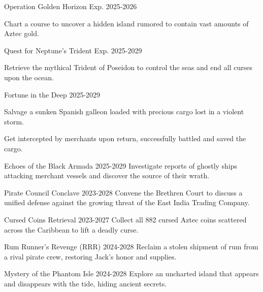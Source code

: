 

\begin{cventries}
\cventry
{Operation Golden Horizon} %
{}{}
{Exp. 2025-2026} %
{ %
\begin{cvitems}
    \item {Chart a course to uncover a hidden island rumored to contain vast amounts of Aztec gold.}
\end{cvitems}
}

\cventry
{Quest for Neptune’s Trident} %
{}{}
{Exp. 2025-2029} %
{ %
\begin{cvitems}
    \item {Retrieve the mythical Trident of Poseidon to control the seas and end all curses upon the ocean.}
\end{cvitems}
}

\cventry
{Fortune in the Deep} %
{}{}
{2025-2029} %
{ %
\begin{cvitems}
    \item {Salvage a sunken Spanish galleon loaded with precious cargo lost in a violent storm.}
    \item {Get intercepted by merchants upon return, successfully battled and saved the cargo. }
\end{cvitems}
}

\cventry
{Echoes of the Black Armada} %
{}{}
{2025-2029} %
{ %
Investigate reports of ghostly ships attacking merchant vessels and discover the source of their wrath.
}

\cventry
{Pirate Council Conclave} %
{}{}
{2023-2028} %
{ %
Convene the Brethren Court to discuss a unified defense against the growing threat of the East India Trading Company.
}

\cventry
{Cursed Coins Retrieval} %
{}{}
{2023-2027} %
{ %
Collect all 882 cursed Aztec coins scattered across the Caribbean to lift a deadly curse.
}

\cventry
{Rum Runner’s Revenge (RRR)} %
{}{}
{2024-2028} %
{ %
Reclaim a stolen shipment of rum from a rival pirate crew, restoring Jack's honor and supplies.
}

\cventry
{Mystery of the Phantom Isle} %
{}{}
{2024-2028} %
{ %
Explore an uncharted island that appears and disappears with the tide, hiding ancient secrets.
}
\end{cventries}

